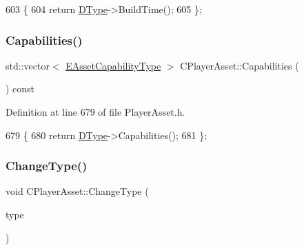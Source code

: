 \begin{DoxyCode}
603                              \{
604             \textcolor{keywordflow}{return} \hyperlink{classCPlayerAsset_a5d61f73471e1e6f0a6ab15f2ffa7b359}{DType}->BuildTime(); 
605         \};
\end{DoxyCode}
\hypertarget{classCPlayerAsset_adf61d7228fa5d665156d111be5a49d6f}{}\label{classCPlayerAsset_adf61d7228fa5d665156d111be5a49d6f} 
\subsubsection{\texorpdfstring{Capabilities()}{Capabilities()}}
{\footnotesize\ttfamily std\+::vector$<$ \hyperlink{GameDataTypes_8h_a35b98ce26aca678b03c6f9f76e4778ce}{E\+Asset\+Capability\+Type} $>$ C\+Player\+Asset\+::\+Capabilities (\begin{DoxyParamCaption}{ }\end{DoxyParamCaption}) const\hspace{0.3cm}{\ttfamily [inline]}}



Definition at line 679 of file Player\+Asset.\+h.


\begin{DoxyCode}
679                                                               \{
680             \textcolor{keywordflow}{return} \hyperlink{classCPlayerAsset_a5d61f73471e1e6f0a6ab15f2ffa7b359}{DType}->Capabilities();  
681         \};
\end{DoxyCode}
\hypertarget{classCPlayerAsset_ab67080b147a98db2cf379870cedbca2d}{}\label{classCPlayerAsset_ab67080b147a98db2cf379870cedbca2d} 
\subsubsection{\texorpdfstring{Change\+Type()}{ChangeType()}}
{\footnotesize\ttfamily void C\+Player\+Asset\+::\+Change\+Type (\begin{DoxyParamCaption}\item[{std\+::shared\+\_\+ptr$<$ \hyperlink{classCPlayerAssetType}{C\+Player\+Asset\+Type} $>$}]{type }\end{DoxyParamCaption})\hspace{0.3cm}{\ttfamily [inline]}}



